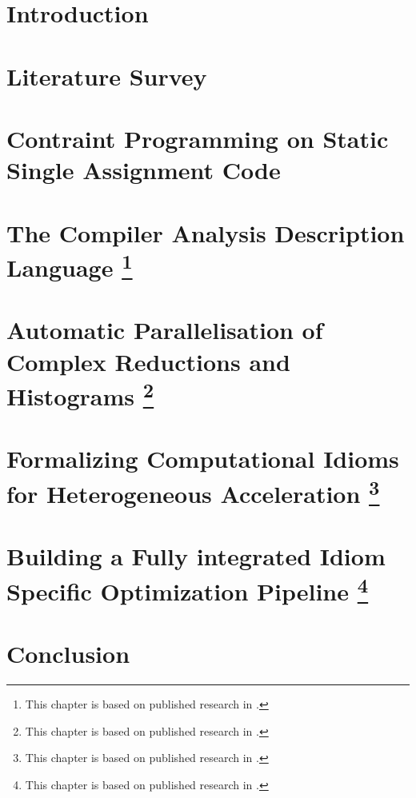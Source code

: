 \documentclass[phd,icsa,twoside,logo,11pt]{infthesis}
\begin{document}
\chapter{Introduction}
    \label{chapter:introduction}
    

\chapter{Literature Survey}
    \label{chapter:literature}
    

\chapter{Contraint Programming on Static Single Assignment Code}
    \label{chapter:theory}
    

\chapter[Introducing the Compiler Analysis Description Language]
        {The Compiler Analysis Description Language
         \footnote{This chapter is based on published research in
                  \citet{Ginsbach:2018:CDS:3178372.3179515}.}}
    \label{chapter:candl}
    

\chapter[Automatic Parallelisation of Complex Reductions and Histograms]
        {Automatic Parallelisation of Complex Reductions and Histograms
         \footnote{This chapter is based on published research in
                   \citet{ginsbach2017discovery}.}}
    \label{chapter:reductions}
    

\chapter[Formalizing Computational Idioms for Heterogeneous Acceleration]
        {Formalizing Computational Idioms for Heterogeneous Acceleration
         \footnote{This chapter is based on published research in
                   \citet{Ginsbach:2018:AML:3173162.3173182}.}}
    \label{chapter:idioms}
    

\chapter[Building a Fully integrated Idiom Specific Optimization Pipeline]
        {Building a Fully integrated Idiom Specific Optimization Pipeline
         \footnote{This chapter is based on published research in
                   \citet{lilacpaper}.}}
    \label{chapter:lilac}
    

\chapter{Conclusion}
    \label{chapter:conclusion}
    



\end{document}
